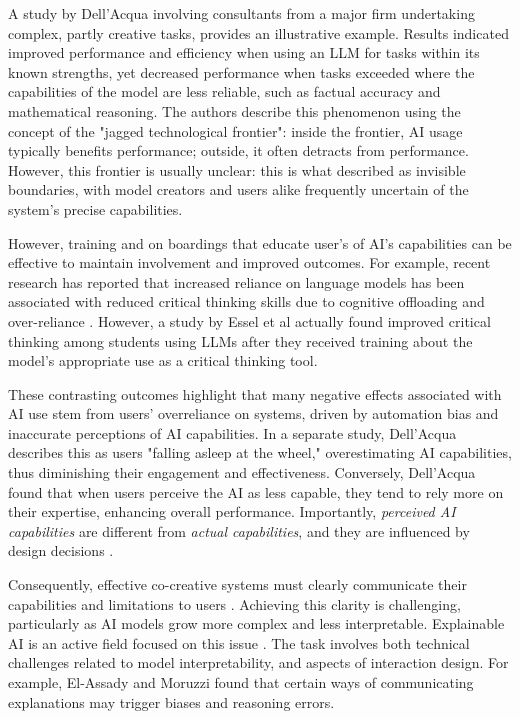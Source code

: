 A study by Dell’Acqua \cite{DellAcqua2023-og} involving consultants from a major firm undertaking complex, partly creative tasks, provides an illustrative example. Results indicated improved performance and efficiency when using an LLM for tasks within its known strengths, yet decreased performance when tasks exceeded where the capabilities of the model are less reliable, such as factual accuracy and mathematical reasoning. The authors describe this phenomenon using the concept of the "jagged technological frontier": inside the frontier, AI usage typically benefits performance; outside, it often detracts from performance. However, this frontier is usually unclear: this is what \cite{Buschek2021-ks} described as invisible boundaries, with model creators and users alike frequently uncertain of the system’s precise capabilities.

However, training and on boardings that educate user's of AI's capabilities can be effective to maintain involvement and improved outcomes. For example, recent research has reported that increased reliance on language models has been associated with reduced critical thinking skills due to cognitive offloading and over-reliance \cite{Gerlich2025-as, Lee2025-dw}. However, a study by Essel et al \cite{Essel2024-qc} actually found improved critical thinking among students using LLMs after they received training about the model's appropriate use as a critical thinking tool.

These contrasting outcomes highlight that many negative effects associated with AI use stem from users’ overreliance on systems, driven by automation bias and inaccurate perceptions of AI capabilities. In a separate study, Dell’Acqua \cite{Dell-Acqua2022-dy} describes this as users "falling asleep at the wheel," overestimating AI capabilities, thus diminishing their engagement and effectiveness. Conversely, Dell’Acqua found that when users perceive the AI as less capable, they tend to rely more on their expertise, enhancing overall performance. Importantly, \textit{perceived AI capabilities} are different from \textit{actual capabilities}, and they are influenced by design decisions \cite{Moruzzi2022-tx, Lawton2023-tb}.

Consequently, effective co-creative systems must clearly communicate their capabilities and limitations to users \cite{Buschek2021-ks}. Achieving this clarity is challenging, particularly as AI models grow more complex and less interpretable. Explainable AI is an active field focused on this issue \cite{Zhu2018-zd, Llano2022-ti, Newn2020-mv, Shneiderman2020-je, Linardatos2020-uq, El-Assady2022-qc, Gomez2023-bp}. The task involves both technical challenges related to model interpretability, and aspects of interaction design. For example, El-Assady and Moruzzi \cite{El-Assady2022-qc} found that certain ways of communicating explanations may trigger biases and reasoning errors.

